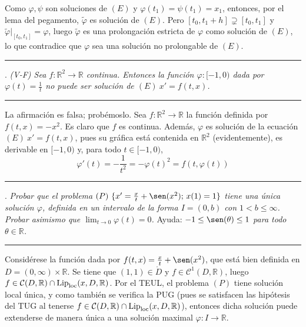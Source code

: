 \documentclass[11pt]{report}
\newcommand{\R}{\mathbb R}
\begin{document}
Como $\varphi, \psi$ son soluciones de $(E)$ y $\varphi(t_1)=\psi(t_1)=x_1$, entonces, por el lema del pegamento, $\widetilde{\varphi}$ es solución de $(E)$. Pero $[t_0,t_1+h] \supsetneq [t_0,t_1]$ y $\widetilde{\varphi}|_{[t_0,t_1]}=\varphi$, luego $\widetilde{\varphi}$ es una prolongación estricta de $\varphi$ como solución de $(E)$, lo que contradice que $\varphi$ sea una solución no prolongable de $(E)$.


\vspace{4mm}

\hrule

\vspace{4mm}

. \textit{(V-F) Sea $f \colon \R^2 \to \R$ continua. Entonces la función $\varphi \colon [-1,0)$ dada por $\varphi(t)=\frac{1}{t}$ no puede ser solución de $(E) \ x'=f(t,x)$.}

\vspace{4mm}

\hrule

\vspace{4mm}

La afirmación es falsa; probémoslo. Sea $f \colon \R^2 \to \R$ la función definida por $f(t,x)=-x^2$. Es claro que $f$ es continua. Además, $\varphi$ es solución de la ecuación $(E) \ x'=f(t,x)$, pues su gráfica está contenida en $\R^2$ (evidentemente), es derivable en $[-1,0)$ y, para todo $t \in [-1,0)$,
\[\varphi'(t)=-\frac{1}{t^2}=-\varphi(t)^2=f(t,\varphi(t))\]

\vspace{4mm}

\hrule

\vspace{4mm}

. \textit{Probar que el problema $(P) \ \{x'=\frac{x}{t}+\sen(x^2); \, x(1)=1\}$ tiene una única solución $\varphi$, definida en un intervalo de la forma $I=(0,b)$ con $1<b \leq \infty$. Probar asimismo que $\lim_{t \to 0} \varphi(t)=0$.} Ayuda: \textit{$-1 \leq \sen(\theta) \leq 1$ para todo $\theta \in \R$.}

\vspace{4mm}

\hrule

\vspace{4mm}

Considérese la función dada por $f(t,x)=\frac{x}{t}+\sen(x^2)$, que está bien definida en $D= (0,\infty) \times \R$. Se tiene que $(1,1) \in \mathring{D}$ y $f \in \mathcal{C}^1(D,\R)$, luego $f \in \mathcal{C}(D,\R) \cap \textup{Lip}_{\textup{loc}}(x,D,\R)$. Por el TEUL, el problema $(P)$ tiene solución local única, y como también se verifica la PUG (pues se satisfacen las hipótesis del TUG al tenerse $f \in \mathcal{C}(D,\R) \cap \textup{Lip}_{\textup{loc}}(x,D,\R)$), entonces dicha solución puede extenderse de manera única a una solución maximal $\varphi \colon I \to \R$. 
\end{document}
